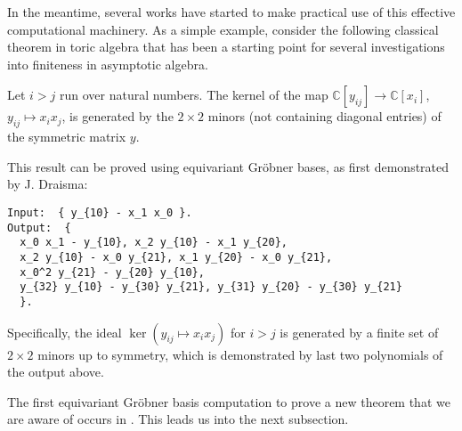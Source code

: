 In the meantime, several works have started to make practical use of this effective computational machinery.  As a simple example, consider 
the following classical theorem in toric algebra that has been a starting point for several investigations into finiteness in asymptotic algebra.

\begin{theorem}\label{toric2x2}
Let $i > j$ run over natural numbers.  The kernel of the map $\mathbb C[y_{ij}] \to \mathbb C[x_i]$, $y_{ij} \mapsto x_i x_j$, is generated by the $2 \times 2$ minors (not containing diagonal entries) of the symmetric matrix $y$.
\end{theorem}

This result can be proved using equivariant Gr\"obner bases, as first demonstrated by J. Draisma:
\begin{M2}
\begin{verbatim}
Input:  { y_{10} - x_1 x_0 }.
Output:  { 
  x_0 x_1 - y_{10}, x_2 y_{10} - x_1 y_{20}, 
  x_2 y_{10} - x_0 y_{21}, x_1 y_{20} - x_0 y_{21}, 
  x_0^2 y_{21} - y_{20} y_{10},  
  y_{32} y_{10} - y_{30} y_{21}, y_{31} y_{20} - y_{30} y_{21} 
  }.
\end{verbatim}
\end{M2}  
Specifically, the ideal $\ker{(y_{ij} \mapsto x_i x_j)}$ for $i > j$ is generated by a finite set of $2 \times 2$ minors up to symmetry, 
which is demonstrated by last two polynomials of the output above.

The first equivariant Gr\"obner basis computation to prove a new theorem that we are aware of occurs in \cite{Brouwer09e}. This leads us into the next subsection. 
